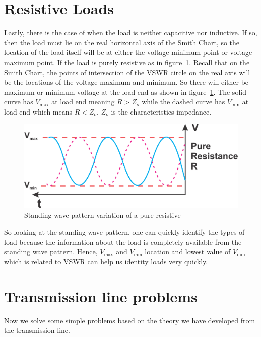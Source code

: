 \section{Resistive Loads}
Lastly, there is the case of when the load is neither capacitive nor inductive. If so, then the load must lie on the real horizontal axis of the Smith Chart, so the location of the load itself will be at either the voltage minimum point or voltage maximum point. If the load is purely resistive as in figure~\ref{fig:group95}. Recall that on the Smith Chart, the points of intersection of the VSWR circle on the real axis will be the locations of the voltage maximum and minimum. So there will either be maximum or minimum voltage at the load end as shown in figure~\ref{fig:group95}. The solid curve has ${V_\max}$ at load end meaning ${R>Z_o}$ while the dashed curve has ${V_\min}$ at load end which means ${R<Z_o}$. ${Z_o}$ is the characteristics impedance.
\begin{figure}[h]
\centering
\includegraphics[scale=0.5]{./graphics/Group95}
\caption{Standing wave pattern variation of a pure resistive}
\label{fig:group95}
\end{figure}

So looking at the standing wave pattern, one can quickly identify the types of load because the information about the load is completely available from the standing wave pattern. Hence, ${V_\max}$ and ${V_\min}$ location and lowest value of ${V_\min}$ which is related to VSWR can help us identity loads very quickly.

\section{Transmission line problems}
Now we solve some simple problems based on the theory we have developed from the transmission line.

